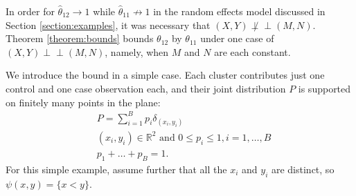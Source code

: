 \documentclass[12pt]{article}
\DeclareMathOperator{\AUC}{AUC}
\newcommand{\E}{E}
\renewcommand{\P}{P}
\newcommand{\cind}{\perp \!\!\! \perp}
\newcommand{\aucindiv}{\theta_{11}}%
\newcommand{\aucpop}{\theta_{12}}%
\newcommand{\aucindivhat}{\hat{\theta}_{11}}%
\newcommand{\aucpophat}{\hat{\theta}_{12}}%
\newcommand{\B}{B}
\newtheorem{lemma}[theorem]{Lemma}
\begin{document}



In order for $\aucpophat\to 1$ while $\aucindivhat\not\to 1$ in the
random effects model discussed in Section \ref{section:examples}, it
was necessary that $(X,Y)\not\cind (M,N)$. Theorem
\ref{theorem:bounds} bounds $\aucpop$ by $\aucindiv$ under one case of $(X,Y)\cind (M,N)$, namely, when $M$ and $N$ are
each constant.


We introduce the bound in a simple case. Each cluster contributes
just one control and one case observation each, and their joint
distribution $\P$ is supported on finitely many points in the
plane:  %
\begin{align}
  &\P = \sum_{i=1}^\B p_i \delta_{(x_i,y_i)}\\
  &(x_i,y_i) \in \mathbb{R}^2 \text{ and } 0\le p_i\le 1,i=1,\ldots,B\\
  &p_1+\ldots+p_\B=1.
\end{align}
For this simple example, assume further that all the $x_i$ and $y_i$ are distinct, so $\psi(x,y)=\{x<y\}$.
\end{document}
